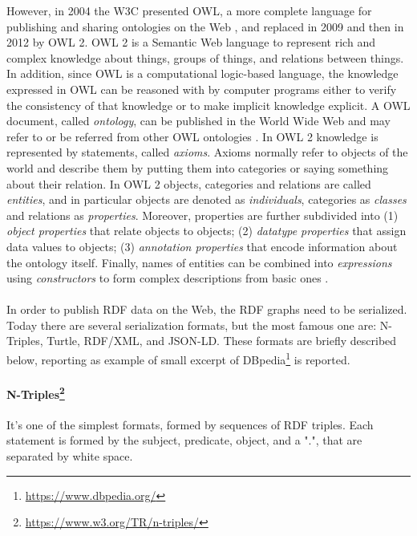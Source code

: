 However, in 2004 the \acl{W3C} presented \ac{OWL}, a more complete language for publishing and sharing ontologies on the Web \cite{bechhofer2004owl}, and replaced in 2009 and then in 2012 by \ac{OWL} 2. \ac{OWL} 2 is a Semantic Web language to represent rich and complex knowledge about things, groups of things, and relations between things. In addition, since \ac{OWL} is a computational logic-based language, the knowledge expressed in \ac{OWL} can be reasoned with by computer programs either to verify the consistency of that knowledge or to make implicit knowledge explicit. A \ac{OWL} document, called \textit{ontology}, can be published in the World Wide Web and may refer to or be referred from other \ac{OWL} ontologies \cite{hitzler2009owl}. In \ac{OWL} 2 knowledge is represented by statements, called \textit{axioms}. Axioms normally refer to objects of the world and describe them by putting them into categories or saying something about their relation. In \ac{OWL} 2 objects, categories and relations are called \textit{entities}, and in particular objects are denoted as \textit{individuals}, categories as \textit{classes} and relations as \textit{properties}. Moreover, properties are further subdivided into (1) \textit{object properties} that relate objects to objects; (2) \textit{datatype properties} that assign data values to objects; (3) \textit{annotation properties} that encode information about the ontology itself. Finally, names of entities can be combined into \textit{expressions} using \textit{constructors} to form complex descriptions from basic ones \cite{hitzler2009owl}.

\paragraph*{}
In order to publish \ac{RDF} data on the Web, the \ac{RDF} graphs need to be serialized. Today there are several serialization formats, but the most famous one are: N-Triples, Turtle, RDF/XML, and JSON-LD. These formats are briefly described below, reporting as example of small excerpt of DBpedia\footnote{\url{https://www.dbpedia.org/}} is reported.

\paragraph*{N-Triples\footnote{\url{https://www.w3.org/TR/n-triples/}}} It's one of the simplest formats, formed by sequences of \ac{RDF} triples. Each statement is formed by the subject, predicate, object, and a ".", that are separated by white space.

